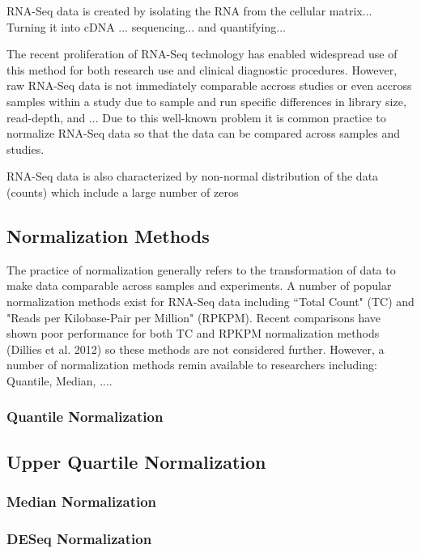 \documentclass{book}\usepackage[]{graphicx}\usepackage[]{color}
\begin{document}
RNA-Seq data is created by isolating the RNA from the cellular matrix... Turning it into cDNA ... sequencing... and quantifying...

The recent proliferation of RNA-Seq technology has enabled widespread use of this method for both research use and clinical diagnostic procedures.  However, raw RNA-Seq data is not immediately comparable accross studies or even accross samples within a study due to sample and run specific differences in library size, read-depth, and ...  Due to this well-known problem it is common practice to normalize RNA-Seq data so that the data can be compared across samples and studies.  

RNA-Seq data is also characterized by non-normal distribution of the data (counts) which include a large number of zeros 
 

\subsection{Normalization Methods}

The practice of normalization generally refers to the transformation of data to make data comparable across samples and experiments.  A number of popular normalization methods exist for RNA-Seq data including ``Total Count" (TC) and "Reads per Kilobase-Pair per Million" (RPKPM).  Recent comparisons have shown poor performance for both TC and RPKPM normalization methods (Dillies et al. 2012) so these methods are not considered further.  However, a number of normalization methods remin available to researchers including: Quantile, Median, ....  

\subsubsection{Quantile Normalization}

\subsection{Upper Quartile Normalization}

\subsubsection{Median Normalization}

\subsubsection{DESeq Normalization}
\end{document}
